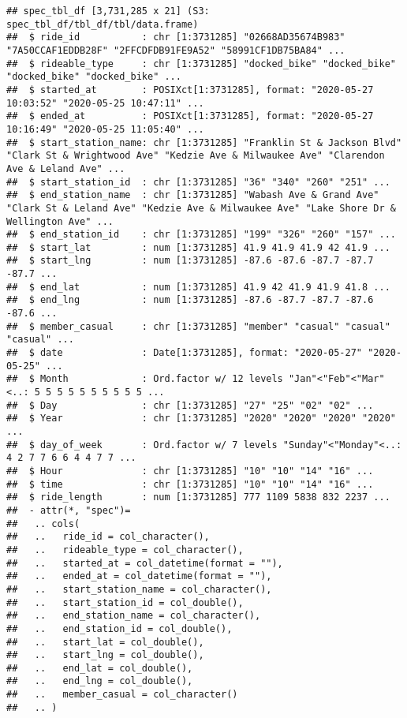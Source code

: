 \documentclass[
]{article}
\begin{document}
\begin{verbatim}
## spec_tbl_df [3,731,285 x 21] (S3: spec_tbl_df/tbl_df/tbl/data.frame)
##  $ ride_id           : chr [1:3731285] "02668AD35674B983" "7A50CCAF1EDDB28F" "2FFCDFDB91FE9A52" "58991CF1DB75BA84" ...
##  $ rideable_type     : chr [1:3731285] "docked_bike" "docked_bike" "docked_bike" "docked_bike" ...
##  $ started_at        : POSIXct[1:3731285], format: "2020-05-27 10:03:52" "2020-05-25 10:47:11" ...
##  $ ended_at          : POSIXct[1:3731285], format: "2020-05-27 10:16:49" "2020-05-25 11:05:40" ...
##  $ start_station_name: chr [1:3731285] "Franklin St & Jackson Blvd" "Clark St & Wrightwood Ave" "Kedzie Ave & Milwaukee Ave" "Clarendon Ave & Leland Ave" ...
##  $ start_station_id  : chr [1:3731285] "36" "340" "260" "251" ...
##  $ end_station_name  : chr [1:3731285] "Wabash Ave & Grand Ave" "Clark St & Leland Ave" "Kedzie Ave & Milwaukee Ave" "Lake Shore Dr & Wellington Ave" ...
##  $ end_station_id    : chr [1:3731285] "199" "326" "260" "157" ...
##  $ start_lat         : num [1:3731285] 41.9 41.9 41.9 42 41.9 ...
##  $ start_lng         : num [1:3731285] -87.6 -87.6 -87.7 -87.7 -87.7 ...
##  $ end_lat           : num [1:3731285] 41.9 42 41.9 41.9 41.8 ...
##  $ end_lng           : num [1:3731285] -87.6 -87.7 -87.7 -87.6 -87.6 ...
##  $ member_casual     : chr [1:3731285] "member" "casual" "casual" "casual" ...
##  $ date              : Date[1:3731285], format: "2020-05-27" "2020-05-25" ...
##  $ Month             : Ord.factor w/ 12 levels "Jan"<"Feb"<"Mar"<..: 5 5 5 5 5 5 5 5 5 5 ...
##  $ Day               : chr [1:3731285] "27" "25" "02" "02" ...
##  $ Year              : chr [1:3731285] "2020" "2020" "2020" "2020" ...
##  $ day_of_week       : Ord.factor w/ 7 levels "Sunday"<"Monday"<..: 4 2 7 7 6 6 4 4 7 7 ...
##  $ Hour              : chr [1:3731285] "10" "10" "14" "16" ...
##  $ time              : chr [1:3731285] "10" "10" "14" "16" ...
##  $ ride_length       : num [1:3731285] 777 1109 5838 832 2237 ...
##  - attr(*, "spec")=
##   .. cols(
##   ..   ride_id = col_character(),
##   ..   rideable_type = col_character(),
##   ..   started_at = col_datetime(format = ""),
##   ..   ended_at = col_datetime(format = ""),
##   ..   start_station_name = col_character(),
##   ..   start_station_id = col_double(),
##   ..   end_station_name = col_character(),
##   ..   end_station_id = col_double(),
##   ..   start_lat = col_double(),
##   ..   start_lng = col_double(),
##   ..   end_lat = col_double(),
##   ..   end_lng = col_double(),
##   ..   member_casual = col_character()
##   .. )
\end{verbatim}
\end{document}
